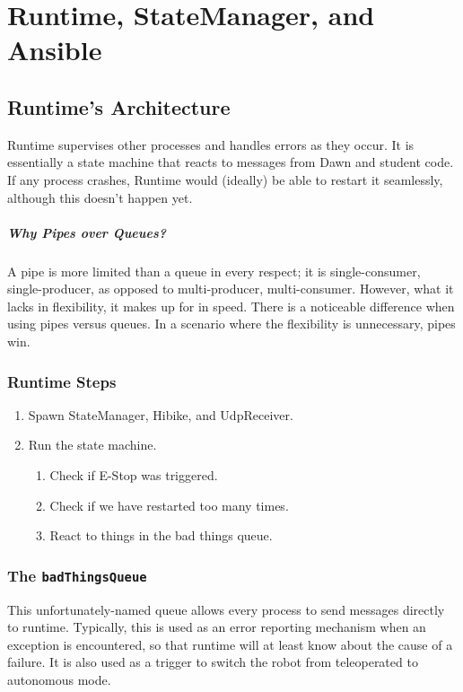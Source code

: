 \documentclass[12pt]{book}
\begin{document}
\chapter{Runtime, StateManager, and Ansible}
\section{Runtime's Architecture}
Runtime supervises other processes and handles errors as they occur. It is
essentially a state machine that reacts to messages from Dawn and student
code. If any process crashes, Runtime would (ideally) be able to restart
it seamlessly, although this doesn't happen yet.

\paragraph{Why Pipes over Queues?}

A pipe is more limited than a queue in every respect; it is single-consumer,
single-producer, as opposed to multi-producer, multi-consumer.
However, what it lacks in flexibility, it makes up for in speed.
There is a noticeable difference when using pipes versus queues.
In a scenario where the flexibility is unnecessary, pipes win.

\subsection{Runtime Steps}
\begin{enumerate}
    \item Spawn StateManager, Hibike, and UdpReceiver.
    \item Run the state machine.
        \begin{enumerate}
            \item Check if E-Stop was triggered.
            \item Check if we have restarted too many times.
            \item React to things in the bad things queue.
        \end{enumerate}
\end{enumerate}

\subsection{The \texttt{badThingsQueue}}
This unfortunately-named queue allows every process to send messages
directly to runtime. Typically, this is used as an error reporting
mechanism when an exception is encountered, so that runtime will at
least know about the cause of a failure. It is also used as a trigger
to switch the robot from teleoperated to autonomous mode.
\end{document}
